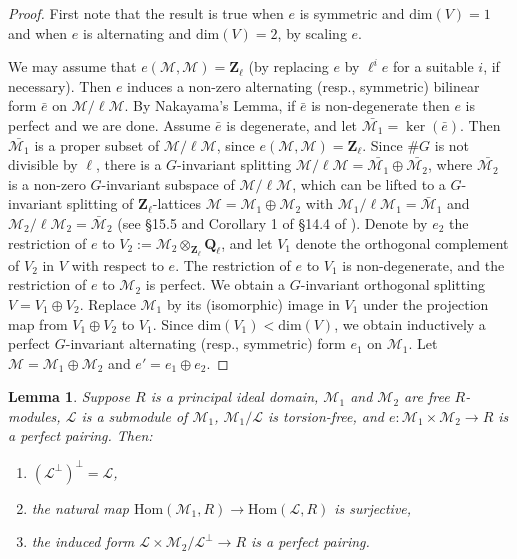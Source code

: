 \documentclass{amsart}
\def\Q{{\mathbf Q}}
\def\Z{{\mathbf Z}}
\def\Hom{\mathrm{Hom}}
\def\M{\mathcal{M}}
\def\L{\mathcal{L}}
\def\dim{\mathrm{dim}}
\newtheorem{lem}[thm]{Lemma}
\theoremstyle{definition}
\begin{document}
\begin{proof}
First note that the result is true when $e$ is symmetric
and $\dim(V)=1$ and when $e$ is alternating and
$\dim(V)=2$, by scaling $e$.

We may assume that
$e(\M,\M)=\Z_{\ell}$ (by replacing 
$e$ by $\ell^i e$ for a suitable $i$, 
if necessary).  
Then $e$ induces a non-zero alternating (resp., symmetric) 
bilinear form $\bar{e}$ on $\M/\ell \M$. 
By Nakayama's Lemma,
if $\bar{e}$ is non-degenerate then $e$ is perfect
and we are done.
Assume $\bar{e}$ is degenerate, and let
$\bar{\M_1}=\ker(\bar{e})$. Then $\bar{\M_1}$ is a proper
subset of $\M/\ell \M$, 
since $e(\M,\M)=\Z_{\ell}$.
Since $\#G$ is not divisible by $\ell$,
there is a $G$-invariant splitting
        $\M/\ell \M= \bar{\M_1} \oplus \bar{\M_2}$,
where $\bar{\M_2}$ is a non-zero $G$-invariant subspace of $\M/\ell \M$,
which can be lifted to a $G$-invariant splitting of 
$\Z_{\ell}$-lattices 
        $\M=\M_1 \oplus \M_2$
with $\M_1/\ell \M_1=\bar{\M}_1$ and $\M_2/\ell \M_2=\bar{\M}_2$
(see \S 15.5 and Corollary 1 of \S 14.4  of \cite{serrereps}).
Denote by $e_2$ the restriction of $e$ to
$V_2:=\M_2\otimes_{\Z_\ell} \Q_{\ell}$, and 
let $V_1$ denote the orthogonal complement of $V_2$ in $V$ with respect
to $e$. The restriction of $e$ to $V_1$ is non-degenerate, and
the restriction of $e$ to $\M_2$ is perfect.
We obtain a $G$-invariant orthogonal splitting
$V= V_1 \oplus V_2$. 
Replace $\M_1$ by its (isomorphic) image in $V_1$ under
the projection map from $V_1 \oplus V_2$ to $V_1$. 
Since $\dim(V_1) < \dim(V)$, we obtain inductively a
perfect
$G$-invariant alternating (resp., symmetric) form  $e_1$ on $\M_1$.
Let $\M=\M_1 \oplus \M_2$ and $e'=e_1 \oplus e_2$.
\end{proof}

\begin{lem}
\label{perp}
Suppose $R$ is a principal ideal domain,  $\M_1$ 
and $\M_2$ are free $R$-modules, $\L$ is a submodule
of $\M_1$, $\M_1/\L$ is torsion-free, and
$e : \M_1 \times \M_2 \to R$ 
is a {\it perfect} pairing.
Then:
\begin{enumerate}
\item[(i)] $(\L^{\perp})^{\perp} = \L$,
\item[(ii)] the natural map 
$\Hom(\M_1,R) \to \Hom(\L,R)$ is surjective,
\item[(iii)] the induced form
$\L \times \M_2/\L^{\perp} \to R$ is a perfect pairing.
\end{enumerate} 
\end{lem}
\end{document}
